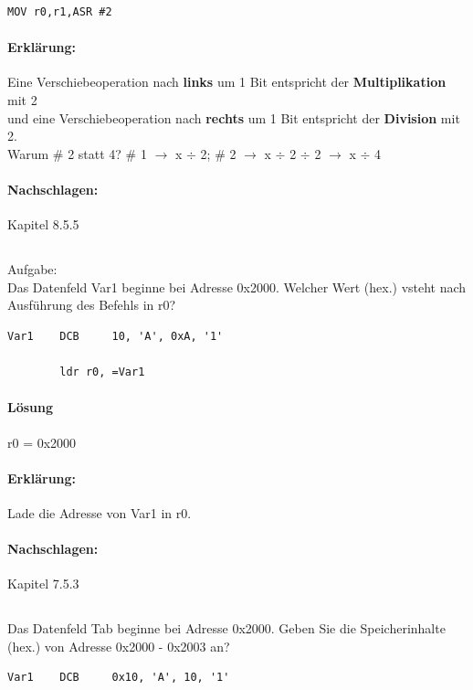 \documentclass[12pt,twoside,a4paper]{article}
\begin{document}
\begin{lstlisting}
MOV r0,r1,ASR #2
\end{lstlisting}


\paragraph*{Erklärung:}
Eine Verschiebeoperation nach \textbf{links} um 1 Bit entspricht der \textbf{Multiplikation} mit 2 \\
und eine Verschiebeoperation nach \textbf{rechts} um 1 Bit entspricht der \textbf{Division} mit 2. \\
Warum \# 2 statt 4? \# 1 $\rightarrow$ x $\div$ 2; \# 2 $\rightarrow$ x $\div$ 2 $\div$ 2 $\rightarrow$ x $\div$ 4 


\paragraph*{Nachschlagen:}
Kapitel 8.5.5

\subsection{}
Aufgabe:\\
Das Datenfeld Var1 beginne bei Adresse 0x2000. Welcher Wert (hex.) vsteht nach Ausführung des Befehls in r0?\\

\begin{lstlisting}
Var1 	DCB 	10, 'A', 0xA, '1'

		ldr r0, =Var1
\end{lstlisting}

\paragraph*{Lösung}
r0 = 0x2000

\paragraph*{Erklärung:}
Lade die Adresse von Var1 in r0. 


\paragraph*{Nachschlagen:}
Kapitel 7.5.3

\subsection{}
Das Datenfeld Tab beginne bei Adresse 0x2000. Geben Sie die Speicherinhalte (hex.) von Adresse 0x2000 - 0x2003 an?\\
\begin{lstlisting}
Var1 	DCB 	0x10, 'A', 10, '1'
\end{lstlisting}
\end{document}
